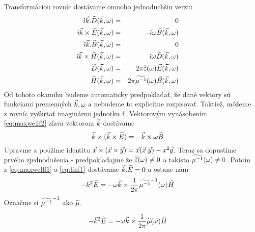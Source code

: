 Transformáciou rovníc dostávame omnoho jednoduchšiu verziu
\begin{eqnarray}
\hat{\imath} \vec{k} . \widetilde{D}{(\vec{k},\omega)} &=& 0 \label{eq:maxwellf1} \\
\hat{\imath} \vec{k} \times \widetilde{E}{(\vec{k},\omega)} &=& - \hat{\imath} \omega \widetilde{B}{(\vec{k},\omega)}
\label{eq:maxwellf2} \\
\hat{\imath} \vec{k} . \widetilde{B}{(\vec{k},\omega)} &=& 0 \label{eq:maxwellf3}\\
\hat{\imath} \vec{k} \times \widetilde{H}{(\vec{k},\omega)} &=& \hat{\imath} \omega \widetilde{D}{(\vec{k},\omega)} \label{eq:maxwellf4}\\
\widetilde{D}{(\vec{k},\omega)} &=& 2 \pi \widetilde{\varepsilon}(\omega) \vec{E}{(\vec{k},\omega)} \label{eq:linf1}\\
\widetilde{H}{(\vec{k},\omega)} &=& 2 \pi \widetilde{\mu^{-1}}(\omega) \vec{B}{(\vec{k},\omega)}
\label{eq:linf2}
\end{eqnarray}
Od tohoto okamihu budeme automaticky predpokladať, že dané vektory sú
funkciami premenných $\vec{k},\omega$ a nebudeme to explicitne
rozpisovať.
Taktiež, môžeme z rovníc vyškrtať imaginárnu jednotku $\hat{\imath}$.
Vektorovým vynásobením \ref{eq:maxwellf2} zľava vektorom $\vec{k}$
dostávame
\begin{equation*}
    \vec{k} \times (\vec{k} \times \widetilde{E}) = - \vec{k}\times
    \omega \widetilde{B}
\end{equation*}
Upravme a použime identitu $\vec{x} \times (\vec{x} \times
\vec{y}) = \vec{x} (\vec{x} . \vec{y}) - x^2
\vec{y}$. Teraz sa dopustíme prvého zjednodušenia - predpokladajme
že $\widetilde{\varepsilon}(\omega)\not=0$ a takisto
$\widetilde{\mu^{-1}}(\omega)\not=0$. Potom z \ref{eq:maxwellf1} a \ref{eq:linf1} dostávame
$\vec{k}.\widetilde{E}=0$ a ostane nám
\begin{equation*}
    - k^2 \widetilde{E} = - \omega \vec{k} \times
    \frac{1}{2 \pi} \widetilde{\mu^{-1}}^{-1}(\omega) \widetilde{H}
\end{equation*}
Označme si $\widetilde{\mu^{-1}}^{-1}$ ako $\widetilde{\mu}$.

\begin{equation*}
    - \vec{k}^2 \widetilde{E} = - \omega \vec{k} \times
    \frac{1}{2 \pi} \widetilde{\mu}(\omega) \widetilde{H}
\end{equation*}

